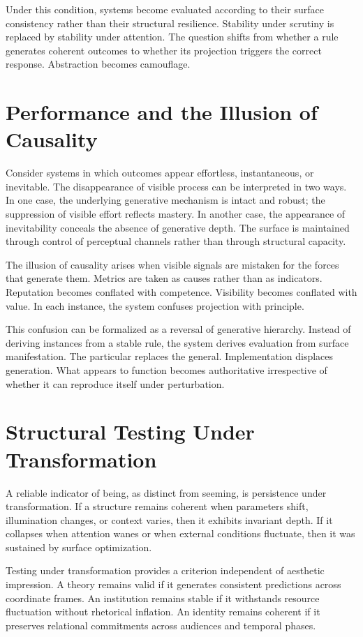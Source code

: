 \documentclass[11pt]{article}
\begin{document}
Under this condition, systems become evaluated according to their surface consistency rather than their structural resilience. Stability under scrutiny is replaced by stability under attention. The question shifts from whether a rule generates coherent outcomes to whether its projection triggers the correct response. Abstraction becomes camouflage.

\section{Performance and the Illusion of Causality}

Consider systems in which outcomes appear effortless, instantaneous, or inevitable. The disappearance of visible process can be interpreted in two ways. In one case, the underlying generative mechanism is intact and robust; the suppression of visible effort reflects mastery. In another case, the appearance of inevitability conceals the absence of generative depth. The surface is maintained through control of perceptual channels rather than through structural capacity.

The illusion of causality arises when visible signals are mistaken for the forces that generate them. Metrics are taken as causes rather than as indicators. Reputation becomes conflated with competence. Visibility becomes conflated with value. In each instance, the system confuses projection with principle.

This confusion can be formalized as a reversal of generative hierarchy. Instead of deriving instances from a stable rule, the system derives evaluation from surface manifestation. The particular replaces the general. Implementation displaces generation. What appears to function becomes authoritative irrespective of whether it can reproduce itself under perturbation.

\section{Structural Testing Under Transformation}

A reliable indicator of being, as distinct from seeming, is persistence under transformation. If a structure remains coherent when parameters shift, illumination changes, or context varies, then it exhibits invariant depth. If it collapses when attention wanes or when external conditions fluctuate, then it was sustained by surface optimization.

Testing under transformation provides a criterion independent of aesthetic impression. A theory remains valid if it generates consistent predictions across coordinate frames. An institution remains stable if it withstands resource fluctuation without rhetorical inflation. An identity remains coherent if it preserves relational commitments across audiences and temporal phases.
\end{document}
